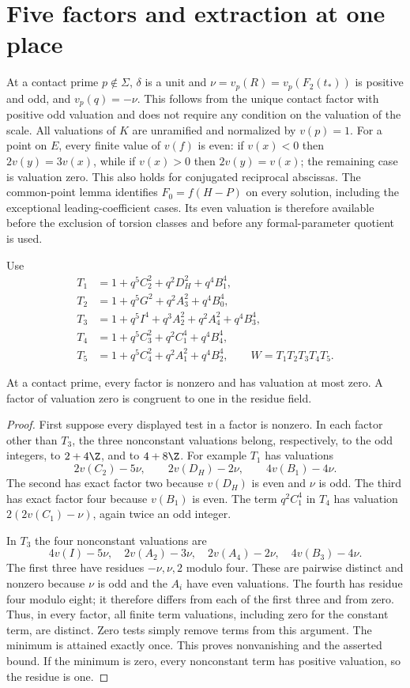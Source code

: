 \section{Five factors and extraction at one place}
At a contact prime $p\notin\Sigma$, $\delta$ is a unit and
$\nu=v_p(R)=v_p(F_2(t_*))$ is positive and odd, and $v_p(q)=-\nu$. This follows
from the unique contact factor with positive odd valuation and
does not require any condition on the valuation of the scale. All valuations
of $K$ are unramified and normalized by $v(p)=1$.
For a point on $E$, every finite value of $v(f)$ is even: if
$v(x)<0$ then $2v(y)=3v(x)$, while if $v(x)>0$ then
$2v(y)=v(x)$; the remaining case is valuation zero.
This also holds for conjugated reciprocal abscissas. The common-point lemma identifies $F_0=f(H-P)$ on every solution,
including the exceptional leading-coefficient cases. Its even valuation
is therefore available before the exclusion of torsion classes and
before any formal-parameter quotient is used.

Use
\begin{align*}
 T_1&=1+q^5C_2^2+q^2D_H^2+q^4B_1^4,\\
 T_2&=1+q^5G^2+q^2A_3^2+q^4B_0^4,\\
 T_3&=1+q^5I^4+q^3A_2^2+q^2A_4^2+q^4B_3^4,\\
 T_4&=1+q^5C_3^2+q^2C_1^4+q^4B_4^4,\\
 T_5&=1+q^5C_4^2+q^2A_1^2+q^4B_2^4,
 \qquad W=T_1T_2T_3T_4T_5.
\end{align*}

\begin{lemma}\label{lem:residues}
At a contact prime, every factor is nonzero and has valuation at most
zero. A factor of valuation zero is congruent to one in the residue field.
\end{lemma}
\begin{proof}
First suppose every displayed test in a factor is nonzero. In each
factor other than $T_3$, the three nonconstant valuations belong,
respectively, to the odd integers, to $2+4\Z$, and to $4+8\Z$.
For example $T_1$ has valuations
\[
 2v(C_2)-5\nu,\qquad 2v(D_H)-2\nu,\qquad4v(B_1)-4\nu.
\]
The second has exact factor two because $v(D_H)$ is even and $\nu$ is
odd. The third has exact factor four because $v(B_1)$ is even.
The term $q^2C_1^4$ in $T_4$ has valuation
$2(2v(C_1)-\nu)$, again twice an odd integer.

In $T_3$ the four nonconstant valuations are
\[
 4v(I)-5\nu,\quad 2v(A_2)-3\nu,\quad
 2v(A_4)-2\nu,\quad4v(B_3)-4\nu.
\]
The first three have residues $-\nu,\nu,2$ modulo four. These are
pairwise distinct and nonzero because $\nu$ is odd and the $A_i$
have even valuations. The fourth has residue four modulo eight;
it therefore differs from each of the first three and from zero.
Thus, in every factor, all finite term valuations, including zero
for the constant term, are distinct. Zero tests simply remove terms
from this argument. The minimum is attained exactly once. This proves
nonvanishing and the asserted bound. If the minimum is zero, every
nonconstant term has positive valuation, so the residue is one.
\end{proof}

